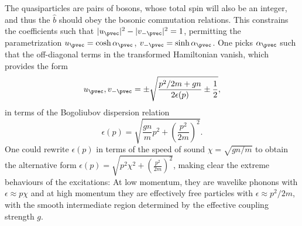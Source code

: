 {{{{{{	
	The quasiparticles are pairs of bosons, whose total spin will also be an integer, and thus the $\hat{b}$ should obey the bosonic commutation relations.
	This constrains the coefficients such that $|u_\pvec|^2-|v_{-\pvec}|^2=1$, permitting the parametrization $u_\pvec = \cosh \alpha_\pvec$, $v_{-\pvec} = \sinh \alpha_\pvec$.
	One picks $\alpha_\pvec$ such that the off-diagonal terms in the transformed Hamiltonian vanish, which provides the form 
	\begin{equation}
		u_\pvec,v_{-\pvec} = \pm \sqrt{\frac{p^2/2m+gn}{2\epsilon(p)} \pm \frac{1}{2}},
	\end{equation}
	in terms of the Bogoliubov dispersion relation
	\begin{equation}
		\epsilon(p) = \sqrt{\frac{gn}{m}p^2+\left(\frac{p^2}{2m}\right)^2}.
	\end{equation}
	One could rewrite $\epsilon(p)$ in terms of the speed of sound $\chi=\sqrt{gn/m}$ to obtain the alternative form $\epsilon(p) = \sqrt{p^2\chi^2+\left(\frac{p^2}{2m}\right)^2}$, making clear the extreme behaviours of the excitations: At low momentum, they are wavelike phonons with $\epsilon\approx p\chi$ and at high momentum they are effectively free particles with $\epsilon\approx p^2/2m$, with the smooth intermediate region determined by the effective coupling strength $g$.

}}}}}}
